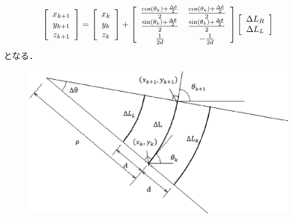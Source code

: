 \documentclass[11pt,a4paper]{jsarticle}
\begin{document}
\begin{equation}
\left[
 \begin{array}{c}
  x_{k+1} \\
  y_{k+1} \\
  z_{k+1} \\
 \end{array}
\right] 
= \left[
\begin{array}{c}
 x_k \\
 y_k \\
 z_k \\
\end{array}
\right]
+ \left[
\begin{array}{cc}
 \frac{\cos(\theta_k) + \frac{\Delta \theta}{2}}{2} & \frac{\cos(\theta_k) + \frac{\Delta \theta}{2}}{2} \\
 \frac{\sin(\theta_k) + \frac{\Delta \theta}{2}}{2} & \frac{\sin(\theta_k) + \frac{\Delta \theta}{2}}{2} \vspace{1mm}\\
 \frac{1}{2d} & -\frac{1}{2d} \\
\end{array}
\right]
\left[
\begin{array}{c}
 \Delta L_R \\
 \Delta L_L \\
\end{array}
\right]
\end{equation}
となる．

\begin{figure}[H]
 \begin{center}
  \includegraphics[scale = 0.5]{./picture/odom.eps}
 \end{center}
\end{figure}
\end{document}

